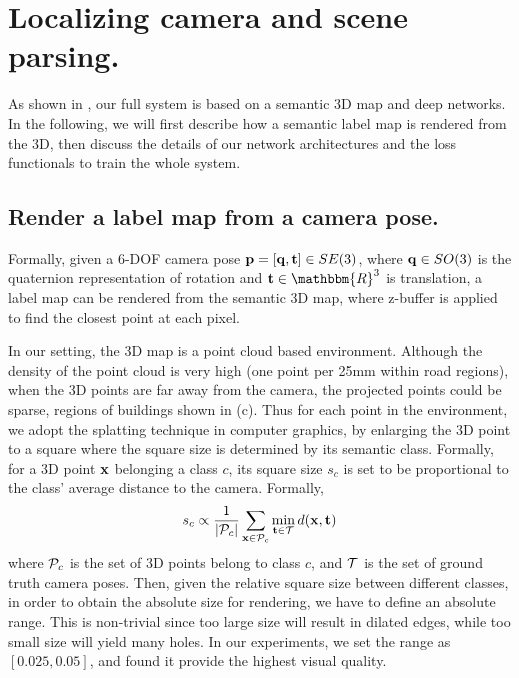 \section{Localizing camera and scene parsing.}
\label{sec:localize_and_parsing}
As shown in , our full system is based on a semantic 3D map and deep networks. In the following, we will first describe how a semantic label map is rendered from the 3D, then discuss the details of our network architectures and the loss functionals to train the whole system.

\subsection{Render a label map from a camera pose.}
\label{sub:render}
Formally, given a 6-DOF camera pose ${\mathbf p} = [{\mathbf q}, {\mathbf t}] \in SE(3)$, where ${\mathbf q} \in SO(3)$ is the quaternion representation of rotation and $\ve{t} \in \mathbbm{R}^3$ is translation, a label map can be rendered from the semantic 3D map, where z-buffer is applied to find the closest point at each pixel.

In our setting, the 3D map is a point cloud based environment. Although the density of the point cloud is very high (one point per 25mm within road regions), when the 3D points are far away from the camera, the projected points could be sparse, \eg regions of buildings shown in (c).
Thus for each point in the environment, we adopt the splatting technique in computer graphics, by enlarging the 3D point to a square where the square size is determined by its semantic class. Formally, for a 3D point ${\mathbf x}$ belonging a class $c$, its square size $s_c$ is set to be proportional to the class' average distance to the camera. Formally,
\begin{align}
\label{eq:square_size}
s_c \propto \frac{1}{|{\mathcal P}_c|}\sum_{{\mathbf x}\in {\mathcal P}_c} \min_{{\mathbf t}\in{\mathcal T}} d({\mathbf x}, {\mathbf t})
\end{align}
where ${\mathcal P}_c$ is the set of 3D points belong to class $c$, and ${\mathcal T}$ is the set of ground truth camera poses. Then, given the relative square size between different classes, in order to obtain the absolute size for rendering, we have to define an absolute range. This is non-trivial since too large size will result in dilated edges, while too small size will yield many holes. In our experiments, we set the range as $[0.025, 0.05]$, and found it provide the highest visual quality.

